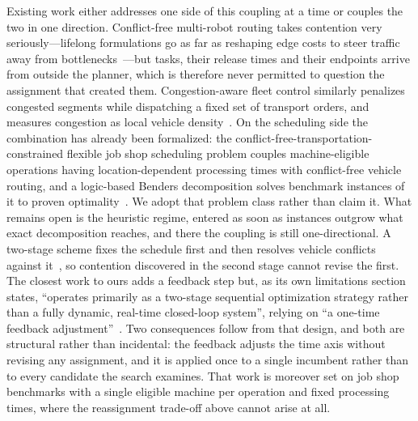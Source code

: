 \documentclass[manuscript,screen,review]{acmart}
\begin{document}

Existing work either addresses one side of this coupling at a time or couples the
two in one direction. Conflict-free multi-robot routing takes contention very
seriously---lifelong formulations go as far as reshaping edge costs to steer
traffic away from bottlenecks~\cite{zhang2024guidance}---but tasks, their release
times and their endpoints arrive from outside the planner, which is therefore
never permitted to question the assignment that created them. Congestion-aware
fleet control similarly penalizes congested segments while dispatching a fixed
set of transport orders, and measures congestion as local vehicle
density~\cite{kim2026congestion}. On the scheduling side the combination has
already been formalized: the conflict-free-transportation-constrained flexible
job shop scheduling problem couples machine-eligible operations having
location-dependent processing times with conflict-free vehicle routing, and a
logic-based Benders decomposition solves benchmark instances of it to proven
optimality~\cite{vanos2026exact}. We adopt that problem class rather than claim
it. What remains open is the heuristic regime, entered as soon as instances
outgrow what exact decomposition reaches, and there the coupling is still
one-directional. A two-stage scheme fixes the schedule first and then resolves
vehicle conflicts against it~\cite{sun2023integrated}, so contention discovered
in the second stage cannot revise the first. The closest work to ours adds a
feedback step but, as its own limitations section states, ``operates primarily as
a two-stage sequential optimization strategy rather than a fully dynamic,
real-time closed-loop system'', relying on ``a one-time feedback
adjustment''~\cite{li2026framework}. Two consequences follow from that design,
and both are structural rather than incidental: the feedback adjusts the time axis
without revising any assignment, and it is applied once to a single incumbent
rather than to every candidate the search examines. That work is moreover set on
job shop benchmarks with a single eligible machine per operation and fixed
processing times, where the reassignment trade-off above cannot arise at all.
\end{document}
